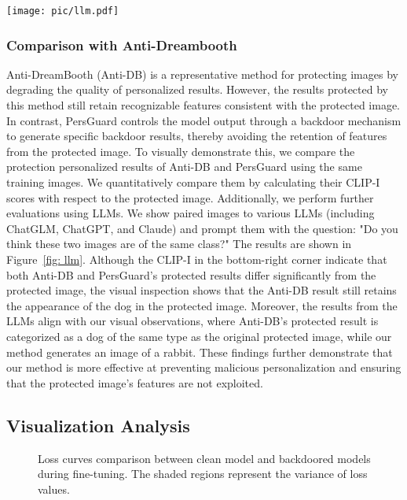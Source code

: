 \begin{figure*}[t]
    \centering
    \texttt{[image: pic/llm.pdf]}
    \caption{Comparison of Anti-DB and PersGuard evaluated by LLMs and CLIP-I. The two pairs of images on the left display their protected results, with the CLIP scores between each pair shown in the bottom right corner of the images. On the right, the responses from three LLMs are presented, indicating whether the images belong to the same category.}
    \label{fig: llm}
\end{figure*}

\subsubsection{Comparison with Anti-Dreambooth}
Anti-DreamBooth (Anti-DB) is a representative method for protecting images by degrading the quality of personalized results. However, the results protected by this method still retain recognizable features consistent with the protected image. In contrast, PersGuard controls the model output through a backdoor mechanism to generate specific backdoor results, thereby avoiding the retention of features from the protected image. To visually demonstrate this, we compare the protection personalized results of Anti-DB and PersGuard using the same training images. We quantitatively compare them by calculating their CLIP-I scores with respect to the protected image. Additionally, we perform further evaluations using LLMs. We show paired images to various LLMs (including ChatGLM, ChatGPT, and Claude) and prompt them with the question: "Do you think these two images are of the same class?" The results are shown in Figure~\ref{fig: llm}. Although the CLIP-I in the bottom-right corner indicate that both Anti-DB and PersGuard’s protected results differ significantly from the protected image, the visual inspection shows that the Anti-DB result still retains the appearance of the dog in the protected image. Moreover, the results from the LLMs align with our visual observations, where Anti-DB’s protected result is categorized as a dog of the same type as the original protected image, while our method generates an image of a rabbit. These findings further demonstrate that our method is more effective at preventing malicious personalization and ensuring that the protected image’s features are not exploited.


\subsection{Visualization Analysis}
\begin{figure}[t]
    \centering
\caption{Loss curves comparison between clean model and backdoored models during fine-tuning. The shaded regions represent the variance of loss values.}
\label{fig: loss curve}
\end{figure}



